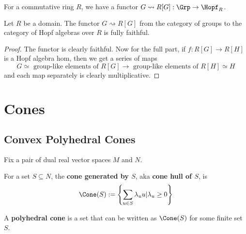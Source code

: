 \begin{definition}
  \label{0-grp-alg}
  \leanok

  For a commutative ring $R$, we have a functor $G \rightsquigarrow R[G] : \Grp \to \Hopf_R$.
\end{definition}


\begin{proposition}
  \label{0-full-faithful-grp-alg}
  \leanok

  Let $R$ be a domain.
  The functor $G \rightsquigarrow R[G]$ from the category of groups to the category of Hopf algebras over $R$ is fully faithful.
\end{proposition}
\begin{proof}
  \leanok

  The functor is clearly faithful.
  Now for the full part, if $f : R[G] \to R[H]$ is a Hopf algebra hom, then we get a series of maps
  \[
    G \simeq \text{ group-like elements of } R[G] \to \text{ group-like elements of } R[H] \simeq H
  \]
  and each map separately is clearly multiplicative.
\end{proof}


\section{Cones}

\subsection{Convex Polyhedral Cones}

Fix a pair of dual real vector spaces $M$ and $N$.


\begin{definition}
  \label{1-2-1-cone-hull}
  \leanok

  For a set $S \subseteq N$, the {\bf cone generated by $S$}, aka {\bf cone hull of $S$}, is
  $$\Cone(S) := \left\{\sum_{u \in S} \lambda_u u | \lambda_u \ge 0\right\}$$
\end{definition}


\begin{definition}
  \label{1-2-1-polyhedral-cone}
  \leanok

  A {\bf polyhedral cone} is a set that can be written as $\Cone(S)$ for some finite set $S$.
\end{definition}


